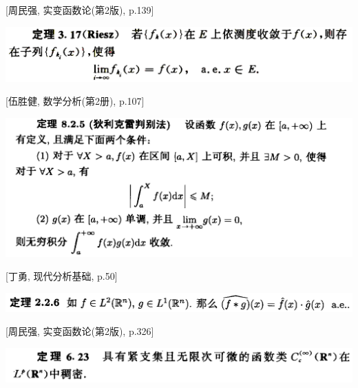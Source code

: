 \documentclass[a4paper,11pt]{article}
\theoremstyle{definition}
\begin{document}
\begin{CJK*}{UTF8}{gbsn}
\begin{framed}
\setlength{\parindent}{0pt}
[周民强, 实变函数论(第2版), p.139]
\vspace{0.1cm}
    
\includegraphics[width=\textwidth]{picture/riesz.PNG}
\end{framed}

\newpage

\begin{framed}
\setlength{\parindent}{0pt}
[伍胜健, 数学分析(第2册), p.107]
\vspace{0.1cm}
    
\includegraphics[width=\textwidth]{picture/dirichlet.PNG}
\end{framed}


\begin{framed}
\setlength{\parindent}{0pt}
[丁勇, 现代分析基础, p.50]
\vspace{0.1cm}

\includegraphics[width=\textwidth]{picture/convolution.PNG}
\end{framed}

\begin{framed}
\setlength{\parindent}{0pt}
[周民强, 实变函数论(第2版), p.326]
\vspace{0.1cm}

\includegraphics[width=\textwidth]{picture/dense.PNG}
\end{framed}


\end{CJK*}
\end{document}
